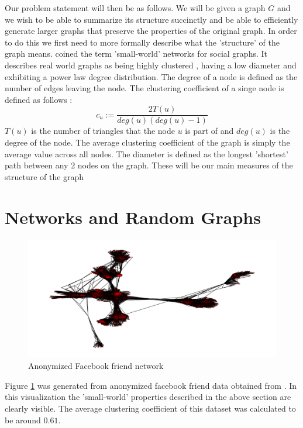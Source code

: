 \documentclass[dvips,12pt]{article}
\begin{document}
Our problem statement will then be as follows. We will be given a graph $G$ and we wish to be able to summarize its structure succinctly and be able to efficiently generate larger graphs that preserve the properties of the original graph. In order to do this we first need to more formally describe what the 'structure' of the graph means. \cite{watts1998} coined the term 'small-world' networks for social graphs. It describes real world graphs as being highly clustered , having a low diameter and exhibiting a power law degree distribution. The degree of a node is defined as the number of edges leaving the node. The clustering coefficient of a singe node is defined as follows : $$c_u := \frac{2T(u)}{deg(u)(deg(u)-1)}$$ $T(u)$ is the number of triangles that the node $u$ is part of and $deg(u)$ is the degree of the node. The average clustering coefficient of the graph is simply the average value across all nodes. The diameter is defined as the longest 'shortest' path between any 2 nodes on the graph. These will be our main measures of the structure of the graph



\section{Networks and Random Graphs}


\begin{figure}[!htb]
\centering
\includegraphics[scale=0.4]{facebook_connectivity_graph}
\caption{Anonymized Facebook friend network}
\label{facebook}
\end{figure}

Figure \ref{facebook} was generated from anonymized facebook friend data obtained from \cite{SNAP-dataset}. In this visualization the 'small-world' properties described in the above section are clearly visible. The average clustering coefficient of this dataset was calculated to be around $0.61$. 
\end{document}

